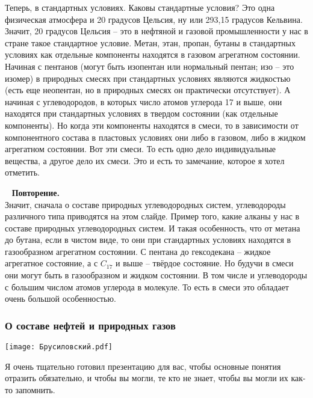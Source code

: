 \documentclass[main.tex]{subfiles}
\begin{document}
Теперь, в стандартных условиях. Каковы стандартные условия?
Это одна физическая атмосфера и 20 градусов Цельсия, ну или 293,15 градусов Кельвина.
Значит, 20 градусов Цельсия -- это в нефтяной и газовой промышленности у нас в стране такое стандартное условие.
Метан, этан, пропан, бутаны в стандартных условиях как отдельные компоненты находятся в газовом агрегатном состоянии.
Начиная с пентанов (могут быть изопентан или нормальный пентан; изо -- это изомер) в природных смесях при стандартных условиях являются жидкостью (есть еще неопентан, но в природных смесях он практически отсутствует).
А начиная с углеводородов, в которых число атомов углерода 17 и выше, они находятся при стандартных условиях в твердом состоянии (как отдельные компоненты).
Но когда эти компоненты находятся в смеси, то в зависимости от компонентного состава в пластовых условиях они либо в газовом, либо в жидком агрегатном состоянии.
Вот эти смеси.
То есть одно дело индивидуальные вещества, а другое дело их смеси.
Это и есть то замечание, которое я хотел отметить.

\ \newline
\textbf{Повторение.}\\
Значит, сначала о составе природных углеводородных систем, углеводороды различного типа приводятся на этом слайде.
Пример того, какие алканы у нас в составе природных углеводородных систем.
И такая особенность, что от метана до бутана, если в чистом виде, то они при стандартных условиях находятся в газообразном агрегатном состоянии.
С пентана до гексодекана -- жидкое агрегатное состояние, а с $C_{17}$ и выше -- твёрдое состояние.
Но будучи в смеси они могут быть в газообразном и жидком состоянии.
В том числе и углеводороды с большим числом атомов углерода в молекуле.
То есть в смеси это обладает очень большой особенностью.

\subsubsection{О составе нефтей и природных газов}

\begin{center}
\texttt{[image: Брусиловский.pdf]}
\end{center}

Я очень тщательно готовил презентацию для вас, чтобы основные понятия отразить обязательно, и чтобы вы могли, те кто не знает, чтобы вы могли их как-то запомнить.
\end{document}
